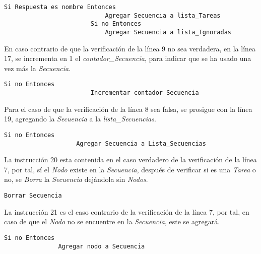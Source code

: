 \begin{tiny}
\begin{lstlisting}[style=C]  
                        Si Respuesta es nombre Entonces
                            Agregar Secuencia a lista_Tareas
                        Si no Entonces 
                            Agregar Secuencia a lista_Ignoradas
\end{lstlisting}
\end{tiny}

En caso contrario de que la verificaci\'on de la l\'inea 9 no sea verdadera, 
 en la l\'inea 17, se incrementa en 1 el \emph{contador\_Secuencia}, para 
 indicar que se ha usado una vez m\'as la \emph{Secuencia}.

\begin{tiny}
\begin{lstlisting}[style=C]
                    Si no Entonces
                        Incrementar contador_Secuencia
\end{lstlisting}
\end{tiny}

Para el caso de que la verificaci\'on de la l\'inea 8 sea falsa, se prosigue 
 con la l\'inea 19, agregando la \emph{Secuencia} a la 
 \emph{lista\_Secuencias}.

\begin{tiny}
\begin{lstlisting}[style=C]
                Si no Entonces
                    Agregar Secuencia a Lista_Secuencias
\end{lstlisting}
\end{tiny}

La instrucci\'on 20 esta contenida en el caso verdadero de la verificaci\'on 
 de la l\'inea 7, por tal, s\'i el \emph{Nodo} existe en la \emph{Secuencia}, 
 despu\'es de verificar si es una \emph{Tarea} o no, se \emph{Borra} la 
 \emph{Secuencia} dej\'andola sin \emph{Nodos}.

\begin{tiny}
\begin{lstlisting}[style=C]            
            Borrar Secuencia
\end{lstlisting}
\end{tiny}

La instrucci\'on 21 es el caso contrario de la verificaci\'on de la línea 7, 
 por tal, en caso de que el \emph{Nodo} no se encuentre en la 
 \emph{Secuencia}, este se agregar\'a.

\begin{tiny}
\begin{lstlisting}[style=C]            
            Si no Entonces
               Agregar nodo a Secuencia
\end{lstlisting}
\end{tiny}

